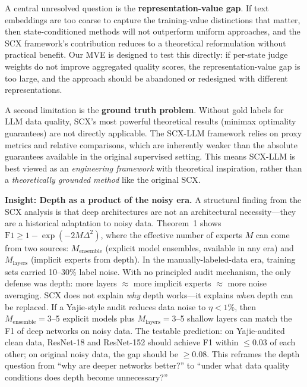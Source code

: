 \documentclass[11pt,twocolumn]{article}
\begin{document}
A central unresolved question is the \textbf{representation-value gap}. If text embeddings are too coarse to capture the training-value distinctions that matter, then state-conditioned methods will not outperform uniform approaches, and the SCX framework's contribution reduces to a theoretical reformulation without practical benefit. Our MVE is designed to test this directly: if per-state judge weights do not improve aggregated quality scores, the representation-value gap is too large, and the approach should be abandoned or redesigned with different representations.

A second limitation is the \textbf{ground truth problem}. Without gold labels for LLM data quality, SCX's most powerful theoretical results (minimax optimality guarantees) are not directly applicable. The SCX-LLM framework relies on proxy metrics and relative comparisons, which are inherently weaker than the absolute guarantees available in the original supervised setting. This means SCX-LLM is best viewed as an \textit{engineering framework} with theoretical inspiration, rather than a \textit{theoretically grounded method} like the original SCX.

\textbf{Insight: Depth as a product of the noisy era.} A structural finding from the SCX analysis is that deep architectures are not an architectural necessity---they are a historical adaptation to noisy data. Theorem~1 shows $\mathrm{F1} \geq 1 - \exp(-2M\Delta^2)$, where the effective number of experts $M$ can come from two sources: $M_{\text{ensemble}}$ (explicit model ensembles, available in any era) and $M_{\text{layers}}$ (implicit experts from depth). In the manually-labeled-data era, training sets carried 10--30\% label noise. With no principled audit mechanism, the only defense was depth: more layers $\approx$ more implicit experts $\approx$ more noise averaging. SCX does not explain \textit{why} depth works---it explains \textit{when} depth can be replaced. If a Yajie-style audit reduces data noise to $\eta < 1\%$, then $M_{\text{ensemble}} = 3$--5 explicit models plus $M_{\text{layers}} = 3$--5 shallow layers can match the F1 of deep networks on noisy data. The testable prediction: on Yajie-audited clean data, ResNet-18 and ResNet-152 should achieve F1 within $\leq 0.03$ of each other; on original noisy data, the gap should be $\geq 0.08$. This reframes the depth question from ``why are deeper networks better?'' to ``under what data quality conditions does depth become unnecessary?''
\end{document}
